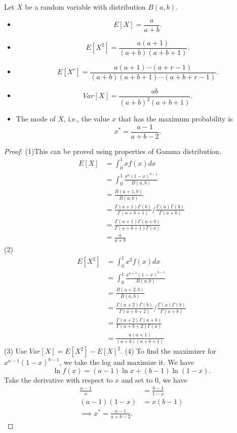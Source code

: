 \begin{refsection}
\begin{lemma}\label{ch:theory-of-statistics:th:propertyBetaDistribution}
Let $X$ be a random variable with distribution $B(a,b)$.
	\begin{itemize}
		\item $$E[X] = \frac{a}{a+b}.$$
		\item $$E[X^2] = \frac{a(a+1)}{(a+b)(a+b+1)}.$$
		\item $$E[X^r] = \frac{a(a+1)\cdots (a+r-1)}{(a+b)(a+b+1)\cdots(a+b+r-1)}.$$
		\item $$Var[X] = \frac{ab}{(a+b)^2(a+b+1)}.$$
		\item The mode of $X$, i.e., the value $x$ that has the maximum probability is
		$$x^* = \frac{a-1}{a+b-2}.$$
	\end{itemize}
\end{lemma}
\begin{proof}
	(1)This can be proved using properties of Gamma distribution.
\begin{align*}
E[X] &= \int_0^1 xf(x)dx \\
&= \int_0^1 \frac{x^a(1-x)^{b-1}}{B(a,b)} \\
&= \frac{B(a+1,b)}{B(a,b)} \\
&= \frac{\Gamma(a+1)\Gamma(b)}{\Gamma(a+b+1)}/\frac{\Gamma(a)\Gamma(b)}{\Gamma(a+b)} \\
&= \frac{\Gamma(a+1)\Gamma(a+b)}{\Gamma(a+b+1)\Gamma(a)} \\
&= \frac{a}{a+b} 
\end{align*}	
	(2) \begin{align*}
	E[X^2] &= \int_0^1 x^2f(x)dx \\
	&= \int_0^1 \frac{x^{a+1}(1-x)^{b-1}}{B(a,b)} \\
	&= \frac{B(a+2,b)}{B(a,b)} \\
	&= \frac{\Gamma(a+2)\Gamma(b)}{\Gamma(a+b+2)}/\frac{\Gamma(a)\Gamma(b)}{\Gamma(a+b)} \\
	&= \frac{\Gamma(a+2)\Gamma(a+b)}{\Gamma(a+b+2)\Gamma(a)} \\
	&= \frac{a(a+1)}{(a+b)(a+b+1)} 
	\end{align*}
(3) Use $Var[X] = E[X^2] - E[X]^2.$
(4) To find the maximizer for $x^{a-1}(1-x)^{b-1}$, we take the log and maximize it. We have
$$\ln f(x) = (a - 1)\ln x + (b-1)\ln (1-x).$$
Take the derivative with respect to $x$ and set to 0, we have
\begin{align*}
\frac{a-1}{x} &= \frac{b-1}{1-x} \\
(a-1)(1-x) &= x(b-1) \\
\implies x^* = \frac{a-1}{a+b-2}.
\end{align*}
\end{proof}



\end{refsection}
